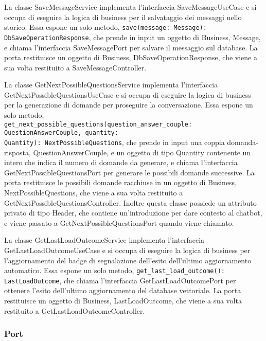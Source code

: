 \label{sec:save_message_service}
La classe SaveMessageService implementa l'interfaccia SaveMessageUseCase e si occupa di eseguire la logica di business per il salvataggio dei messaggi nello storico. Essa espone un solo metodo, \texttt{save(message: Message): DbSaveOperationResponse}, che prende in input un oggetto di Business, Message, e chiama l'interfaccia SaveMessagePort per salvare il messaggio sul database. La porta restituisce un oggetto di Business, DbSaveOperationResponse, che viene a sua volta restituito a SaveMessageController.

\label{sec:get_next_possible_questions_service}
La classe GetNextPossibleQuestionsService implementa l'interfaccia GetNextPossibleQuestionsUseCase e si occupa di eseguire la logica di business per la generazione di domande per proseguire la conversazione. Essa espone un solo metodo,\\ \texttt{get\_next\_possible\_questions(question\_answer\_couple: QuestionAnswerCouple, quantity:\\ Quantity): NextPossibleQuestions}, che prende in input una coppia domanda-risposta, QuestionAnswerCouple, e un oggetto di tipo Quantity contenente un intero che indica il numero di domande da generare, e chiama l'interfaccia GetNextPossibleQuestionsPort per generare le possibili domande successive. La porta restituisce le possibili domande racchiuse in un oggetto di Business, NextPossibleQuestions, che viene a sua volta restituito a GetNextPossibleQuestionsController.
Inoltre questa classe possiede un attributo privato di tipo Header, che contiene un'introduzione per dare contesto al chatbot, e viene passato a GetNextPossibleQuestionsPort quando viene chiamato.

\label{sec:get_last_load_outcome_service}
La classe GetLastLoadOutcomeService implementa l'interfaccia GetLastLoadOutcomeUseCase e si occupa di eseguire la logica di business per l'aggiornamento del badge di segnalazione dell'esito dell'ultimo aggiornamento automatico. Essa espone un solo metodo, \texttt{get\_last\_load\_outcome(): LastLoadOutcome}, che chiama l'interfaccia GetLastLoadOutcomePort per ottenere l'esito dell'ultimo aggiornamento del database vettoriale. La porta restituisce un oggetto di Business, LastLoadOutcome, che viene a sua volta restituito a GetLastLoadOutcomeController.

\newpage


\subsubsection{Port}
\label{sec:port}

